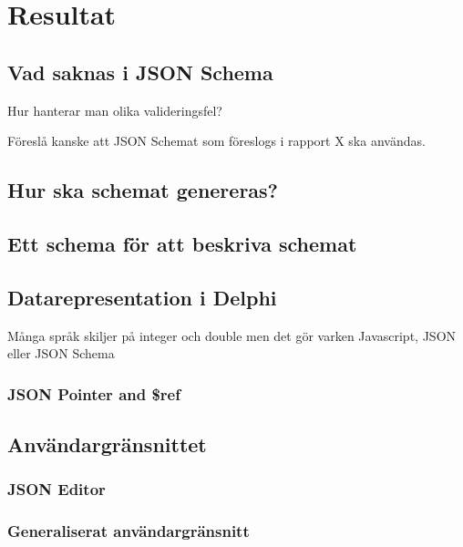 \documentclass[swedish]{kththesis}
\begin{document}
\chapter{Resultat}

\section{Vad saknas i JSON Schema}
Hur hanterar man olika valideringsfel?

Föreslå kanske att JSON Schemat som föreslogs i rapport X ska användas.

\section{Hur ska schemat genereras?}

\section{Ett schema för att beskriva schemat}

\section{Datarepresentation i Delphi}
Många språk skiljer på integer och double men det gör varken Javascript, JSON eller JSON Schema


\subsection{JSON Pointer and \$ref}

\section{Användargränsnittet}

\subsection{JSON Editor}

\subsection{Generaliserat användargränsnitt}
\end{document}

